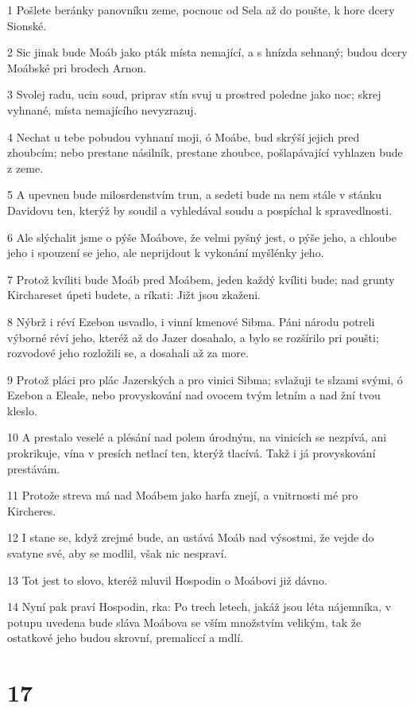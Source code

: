 \par 1 Pošlete beránky panovníku zeme, pocnouc od Sela až do poušte, k hore dcery Sionské.
\par 2 Sic jinak bude Moáb jako pták místa nemající, a s hnízda sehnaný; budou dcery Moábské pri brodech Arnon.
\par 3 Svolej radu, ucin soud, priprav stín svuj u prostred poledne jako noc; skrej vyhnané, místa nemajícího nevyzrazuj.
\par 4 Nechat u tebe pobudou vyhnaní moji, ó Moábe, bud skrýší jejich pred zhoubcím; nebo prestane násilník, prestane zhoubce, pošlapávající vyhlazen bude z zeme.
\par 5 A upevnen bude milosrdenstvím trun, a sedeti bude na nem stále v stánku Davidovu ten, kterýž by soudil a vyhledával soudu a pospíchal k spravedlnosti.
\par 6 Ale slýchalit jsme o pýše Moábove, že velmi pyšný jest, o pýše jeho, a chloube jeho i spouzení se jeho, ale neprijdout k vykonání myšlénky jeho.
\par 7 Protož kvíliti bude Moáb pred Moábem, jeden každý kvíliti bude; nad grunty Kirchareset úpeti budete, a ríkati: Jižt jsou zkaženi.
\par 8 Nýbrž i réví Ezebon usvadlo, i vinní kmenové Sibma. Páni národu potreli výborné réví jeho, kteréž až do Jazer dosahalo, a bylo se rozšírilo pri poušti; rozvodové jeho rozložili se, a dosahali až za more.
\par 9 Protož pláci pro plác Jazerských a pro vinici Sibma; svlažuji te slzami svými, ó Ezebon a Eleale, nebo provyskování nad ovocem tvým letním a nad žní tvou kleslo.
\par 10 A prestalo veselé a plésání nad polem úrodným, na vinicích se nezpívá, ani prokrikuje, vína v presích netlací ten, kterýž tlacívá. Takž i já provyskování prestávám.
\par 11 Protože streva má nad Moábem jako harfa znejí, a vnitrnosti mé pro Kircheres.
\par 12 I stane se, když zrejmé bude, an ustává Moáb nad výsostmi, že vejde do svatyne své, aby se modlil, však nic nespraví.
\par 13 Tot jest to slovo, kteréž mluvil Hospodin o Moábovi již dávno.
\par 14 Nyní pak praví Hospodin, rka: Po trech letech, jakáž jsou léta nájemníka, v potupu uvedena bude sláva Moábova se vším množstvím velikým, tak že ostatkové jeho budou skrovní, premaliccí a mdlí.

\chapter{17}

